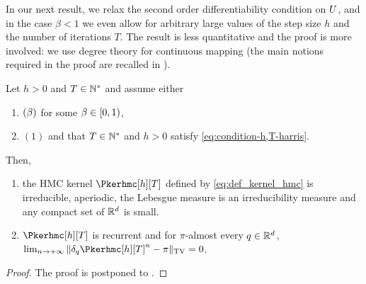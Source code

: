 In our next result, we relax the second order differentiability
condition on $U$, and in the case $\beta <1$ we even allow for
arbitrary large values of the step size $h$ and the number of iterations $T$.
The result is less quantitative and the proof
is more involved: we use degree theory for continuous
mapping (the main notions  required in the proof are recalled in  ).
\begin{theorem}\label{theo:irred_D}
Let $h > 0$ and $T \in \mathbb{N}^{*}$ and assume either
\begin{enumerate}[label=(\alph*)]
\item
\label{theo:irred_D_a}
 $(\beta)$ for some $\beta \in \left[0,1\right)$,
\item
\label{theo:irred_D_b}
 $(1)$ and that  $T \in \mathbb{N}^{*}$ and $h > 0$ satisfy \eqref{eq:condition-h,T-harris}.
\end{enumerate}
Then,
\begin{enumerate}[label=(\roman*)]
\item the HMC kernel $\Pkerhmc[h][T]$ defined by \eqref{eq:def_kernel_hmc} is irreducible, aperiodic, the Lebesgue measure is an
  irreducibility measure and any compact set of $\mathbb{R}^d$ is  small.
\item $\Pkerhmc[h][T]$ is recurrent and for $\pi$-almost every $q \in \mathbb{R}^d$,
$\lim_{n \to \plusinfty}    \tvnorm{\delta_q \Pkerhmc[h][T]^n - \pi} = 0$.
\end{enumerate}
\end{theorem}

\begin{proof}
The proof is postponed to .
\end{proof}



